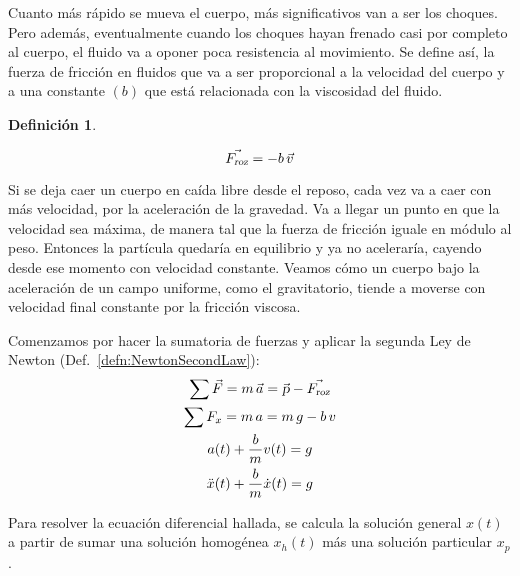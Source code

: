 \documentclass[a5paper,12pt,twoside]{book}
\newtheorem{defn}{{Definición}}[chapter]
\begin{document}
Cuanto más rápido se mueva el cuerpo, más significativos van a ser los choques.
Pero además, eventualmente cuando los choques hayan frenado casi por completo al cuerpo, el fluido va a oponer poca resistencia al movimiento.
Se define así, la fuerza de fricción en fluidos que va a ser proporcional a la velocidad del cuerpo y a una constante $(b)$ que está relacionada con la viscosidad del fluido.

\begin{mdframed}[style=MyFrame1]
    \begin{defn}
        \label{defn:fluidFrictionForce}
    \end{defn}
    \begin{equation*}
        \Vec{{{F}_\textsl{{roz}}}} = - b \, \Vec{v}
    \end{equation*}
\end{mdframed}

Si se deja caer un cuerpo en caída libre desde el reposo, cada vez va a caer con más velocidad, por la aceleración de la gravedad.
Va a llegar un punto en que la velocidad sea máxima, de manera tal que la fuerza de fricción iguale en módulo al peso.
Entonces la partícula quedaría en equilibrio y ya no aceleraría, cayendo desde ese momento con velocidad constante.
Veamos cómo un cuerpo bajo la aceleración de un campo uniforme, como el gravitatorio, tiende a moverse con velocidad final constante por la fricción viscosa.

\begin{center}
    \def\svgwidth{0.8\linewidth}
    
\end{center}

Comenzamos por hacer la sumatoria de fuerzas y aplicar la segunda Ley de Newton (Def.\ \ref{defn:NewtonSecondLaw}):
\begin{gather*}
    \sum \Vec{F} = m \, \Vec{a} = \Vec{\textsl{p}} - \Vec{{{F}_\textsl{{roz}}}}
    \\
    \sum F_x = m \, a = m \, g - b \, v
    \\
    a(t) + \frac{b}{m} v(t) = g
    \\
    \ddot{x}(t) + \frac{b}{m} \dot{x}(t) = g
\end{gather*}

Para resolver la ecuación diferencial hallada, se calcula la solución general $x(t)$ a partir de sumar una solución homogénea $x_h(t)$ más una solución particular $x_p$.
\end{document}
